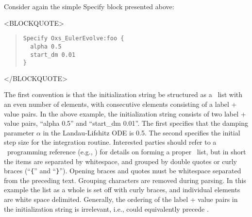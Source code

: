 %
\label{par:specInitString}%
Consider again the simple Specify block presented above:
\begin{rawhtml}
<BLOCKQUOTE>
\end{rawhtml}
\begin{quote}
\begin{verbatim}
Specify Oxs_EulerEvolve:foo {
  alpha 0.5
  start_dm 0.01
}
\end{verbatim}
\end{quote}
\begin{rawhtml}
</BLOCKQUOTE>
\end{rawhtml}
The first convention is that the initialization string be structured as
a \Tcl\ list with an even number of elements, with
consecutive elements consisting of a label + value pairs.  In the above
example, the initialization string consists of two label + value pairs,
``alpha 0.5'' and ``start\_dm 0.01''.  The first specifies that the
damping parameter $\alpha$ in the Landau-Lifshitz ODE is 0.5.  The
second specifies the initial step size for the integration routine.
Interested parties should refer to a \Tcl\ programming reference (e.g.,
\cite{welch2000}) for details on forming a proper \Tcl\ list, but in short
the items are separated by whitespace, and grouped by double quotes or
curly braces (``\verb+{+'' and ``\verb+}+'').  Opening braces and quotes
must be whitespace separated from the preceding text.  Grouping
characters are removed during parsing.  In this example the list as a
whole is set off with curly braces, and individual elements are white
space delimited.  Generally, the ordering of the label + value pairs in
the initialization string is irrelevant, i.e.,  could
equivalently precede .

